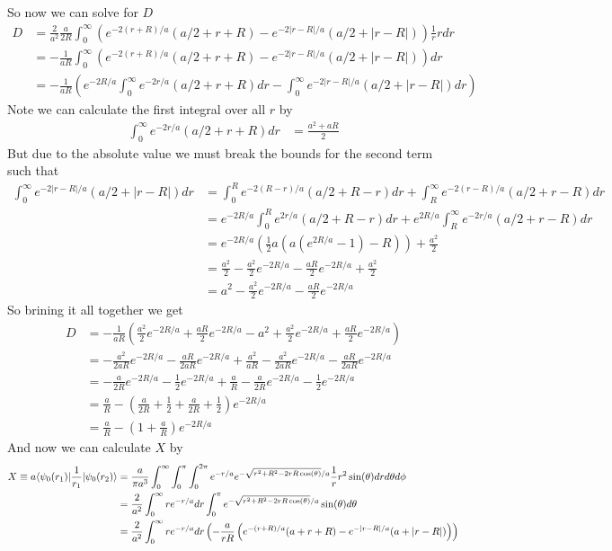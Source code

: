 \documentclass[11pt]{article}
\numberwithin{equation}{section}
\begin{document}
So now we can solve for $D$
\begin{align*}
D &= \frac{2}{a^2}\frac{a}{2R}\int_{0}^{\infty}\left(e^{-2(r+R)/a}(a/2+r+R) - e^{-2|r-R|/a}(a/2+|r-R|)\right)\frac{1}{r}rdr\\
&= -\frac{1}{aR}\int_{0}^{\infty}\left(e^{-2(r+R)/a}(a/2+r+R) - e^{-2|r-R|/a}(a/2+|r-R|)\right)dr\\
&= -\frac{1}{aR}\left(e^{-2R/a}\int_{0}^{\infty}e^{-2r/a}(a/2+r+R)dr - \int_{0}^{\infty}e^{-2|r-R|/a}(a/2+|r-R|)dr\right)
\end{align*}
Note we can calculate the first integral over all $r$ by
\begin{align*}
\int_{0}^{\infty}e^{-2r/a}(a/2+r+R)dr &= \frac{a^2+aR}{2}
\end{align*}
But due to the absolute value we must break the bounds for the second term such that
\begin{align*}
\int_{0}^{\infty}e^{-2|r-R|/a}(a/2+|r-R|)dr &= \int_{0}^{R}e^{-2(R-r)/a}(a/2+R-r)dr + \int_{R}^{\infty}e^{-2(r-R)/a}(a/2+r-R)dr\\
&= e^{-2R/a}\int_{0}^{R}e^{2r/a}(a/2+R-r)dr + e^{2R/a}\int_{R}^{\infty}e^{-2r/a}(a/2+r-R)dr\\
&= e^{-2R/a}\left(\frac{1}{2}a(a(e^{2R/a}-1)-R)\right) + \frac{a^2}{2}\\
&= \frac{a^2}{2} - \frac{a^2}{2}e^{-2R/a} - \frac{aR}{2}e^{-2R/a} + \frac{a^2}{2}\\
&= a^2 - \frac{a^2}{2}e^{-2R/a} - \frac{aR}{2}e^{-2R/a}
\end{align*}
So brining it all together we get
\begin{align*}
D &= -\frac{1}{aR}\left(\frac{a^2}{2}e^{-2R/a} + \frac{aR}{2}e^{-2R/a} - a^2 + \frac{a^2}{2}e^{-2R/a} + \frac{aR}{2}e^{-2R/a}\right)\\
&= -\frac{a^2}{2aR}e^{-2R/a} - \frac{aR}{2aR}e^{-2R/a} + \frac{a^2}{aR} - \frac{a^2}{2aR}e^{-2R/a} - \frac{aR}{2aR}e^{-2R/a}\\
&= -\frac{a}{2R}e^{-2R/a} - \frac{1}{2}e^{-2R/a} + \frac{a}{R} - \frac{a}{2R}e^{-2R/a} - \frac{1}{2}e^{-2R/a}\\
&= \frac{a}{R} - \left(\frac{a}{2R} + \frac{1}{2} + \frac{a}{2R} + \frac{1}{2}\right)e^{-2R/a}\\
&= \frac{a}{R} - \left(1+ \frac{a}{R} \right)e^{-2R/a}
\end{align*}
And now we can calculate $X$ by
\begin{align*}
X\equiv a\langle{\psi_0(r_1)}|\frac{1}{r_1}|{\psi_0(r_2)}\rangle &= \frac{a}{\pi a^3}\int_{0}^{\infty}\int_{0}^{\pi}\int_{0}^{2\pi}e^{-r/a}e^{-\sqrt{r^2+R^2-2rR\cos(\theta)}/a}\frac{1}{r}r^2\sin(\theta)drd\theta d\phi\\
&= \frac{2}{a^2}\int_{0}^{\infty}re^{-r/a}dr\int_{0}^{\pi}e^{-\sqrt{r^2+R^2-2rR\cos(\theta)}/a}\sin(\theta)d\theta\\
&= \frac{2}{a^2}\int_{0}^{\infty}re^{-r/a}dr\left(-\frac{a}{rR}\left(e^{-(r+R)/a}(a+r+R) - e^{-|r-R|/a}(a+|r-R|)\right)\right)
\end{align*}
\end{document}
